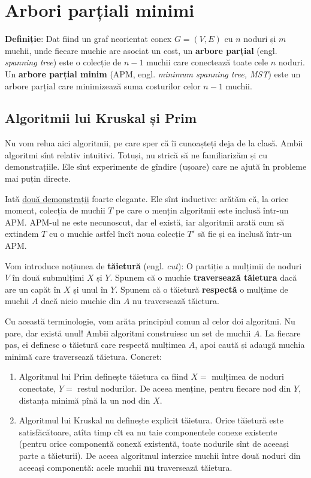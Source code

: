 \documentclass[../main.tex]{subfiles}
\begin{document}
\chapter{Arbori parțiali minimi}

\textbf{Definiție}: Dat fiind un graf neorientat conex $G=(V,E)$ cu $n$ noduri și $m$ muchii, unde fiecare muchie are asociat un cost, un \textbf{arbore parțial} (engl. \textit{spanning tree}) este o colecție de $n-1$ muchii care conectează toate cele $n$ noduri. Un \textbf{arbore parțial minim} (APM, engl. \textit{minimum spanning tree, MST}) este un arbore parțial care minimizează suma costurilor celor $n-1$ muchii.

\section{Algoritmii lui Kruskal și Prim}

Nu vom relua aici algoritmii, pe care sper că îi cunoașteți deja de la clasă. Ambii algoritmi sînt relativ intuitivi. Totuși, nu strică să ne familiarizăm și cu demonstrațiile. Ele sînt experimente de gîndire (ușoare) care ne ajută în probleme mai puțin directe.

Iată \href{https://www.cs.jhu.edu/~mdinitz/IntroAlgorithms/Lectures/lecture14.pdf}{două demonstrații} foarte elegante. Ele sînt inductive: arătăm că, la orice moment, colecția de muchii $T$ pe care o mențin algoritmii este inclusă într-un APM. APM-ul ne este necunoscut, dar el există, iar algoritmii arată cum să extindem $T$ cu o muchie astfel încît noua colecție $T'$ să fie și ea inclusă într-un APM.

Vom introduce noțiunea de \textbf{tăietură} (engl. \textit{cut}): O partiție a mulțimii de noduri $V$ în două submulțimi $X$ și $Y$. Spunem că o muchie \textbf{traversează tăietura} dacă are un capăt în $X$ și unul în $Y$. Spunem că o tăietură \textbf{respectă} o mulțime de muchii $A$ dacă nicio muchie din $A$ nu traversează tăietura.

Cu această terminologie, vom arăta principiul comun al celor doi algoritmi. Nu pare, dar există unul! Ambii algoritmi construiesc un set de muchii $A$. La fiecare pas, ei definesc o tăietură care respectă mulțimea $A$, apoi caută și adaugă muchia minimă care traversează tăietura. Concret:

\begin{enumerate}
  \item Algoritmul lui Prim definește tăietura ca fiind $X=$ mulțimea de noduri conectate, $Y=$ restul nodurilor. De aceea menține, pentru fiecare nod din $Y$, distanța minimă pînă la un nod din $X$.

  \item Algoritmul lui Kruskal nu definește explicit tăietura. Orice tăietură este satisfăcătoare, atîta timp cît ea nu taie componentele conexe existente (pentru orice componentă conexă existentă, toate nodurile sînt de aceeași parte a tăieturii). De aceea algoritmul interzice muchii între două noduri din aceeași componentă: acele muchii \textbf{nu} traversează tăietura.
\end{enumerate}
\end{document}

